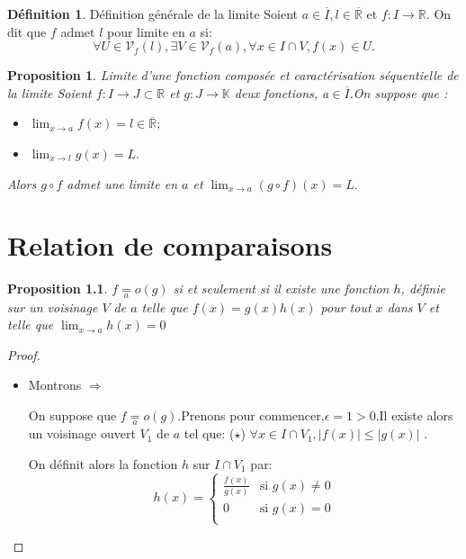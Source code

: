 \documentclass[12pt]{book}
\theoremstyle{definition}\newtheorem{dfn}{Définition}[chapter]
\theoremstyle{plain}\newtheorem{thm}{Théorème}[chapter]
\theoremstyle{plain}\newtheorem{prp}{Proposition}[chapter]
\theoremstyle{plain}\newtheorem{lem}{\bf Lemme}[chapter]
\theoremstyle{plain}\newtheorem{axm}{\bf Axiome}[chapter]
\theoremstyle{plain}\newtheorem{lmm}{\bf Lemme}[chapter]
\theoremstyle{plain}\newtheorem{cor}{\bf Corollaire}[chapter]
\theoremstyle{remark}\newtheorem{rem}{Remarque}[chapter]
\begin{document}
\begin{dfn}{Définition générale de la limite}
        Soient $a\in \overline{I},l\in \overline{\mathbb{R}}$ et $f:I\rightarrow \mathbb{R}.$ On dit que $f$ admet $l$ pour limite en $a$ si:
                $$
                \forall U\in \mathcal{V}_{f}(l),\exists V\in
                \mathcal{V}_{f}(a), \forall x\in I\cap V, f(x)\in U.
                $$
\end{dfn}

\begin{prp}{Limite d'une fonction composée et caractérisation séquentielle de la limite}
Soient $f:I\rightarrow J\subset \mathbb{R}$ et $g:J\rightarrow\mathbb{K}$ deux fonctions, a$\in \overline{I}$.On suppose que :

\begin{itemize}
\item[1.] $\lim_{x\to a}f(x)=l\in \overline{\mathbb{R}};$
\item[2.] $\lim_{x\to l}g(x)=L.$
\end{itemize}

Alors $g\circ f$ admet une limite en $a$ et $\lim_{x\to a}(g\circ f)(x)=L.$

\end{prp}

\chapter{Relation de comparaisons}
\begin{prp}
$f\underset{a}{=}o(g)$ si et seulement si il existe une fonction $h$, définie sur un voisinage $V$ de $a$ telle que $f(x)=g(x)h(x)$ pour tout $x$ dans $V$ et telle que $\lim_{x\to a}h(x)=0$
\end{prp}
\begin{proof}
        \begin{itemize}
\item Montrons $\Rightarrow$

On suppose que $f\underset{a}{=}o(g)$.Prenons pour commencer,$\epsilon=1>0$.Il existe alors un voisinage ouvert $V_1$ de $a$ tel que: ($\star$) $\forall x\in I\cap V_1,\left |f(x)\right |\le \left |g(x)\right |$ .

On définit alors la fonction $h$ sur $I\cap V_1$ par:
\begin{equation*}
h(x)=
\begin{cases}
\frac{f(x)}{g(x)} &\mbox{si $g(x)\not=0$}\\
0 &\mbox{si $g(x)=0$}\\
\end{cases}
\end{equation*}
        \end{itemize}
\end{proof}
\end{document}
